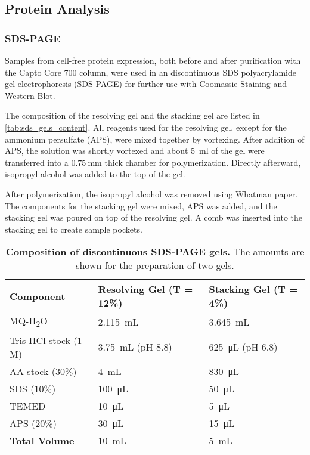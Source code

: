 \subsection{Protein Analysis}
\subsubsection{SDS-PAGE}
Samples from cell-free protein expression, both before and after purification with the Capto\textsuperscript{\texttrademark} Core 700 column, were used in an discontinuous SDS polyacrylamide gel electrophoresis (SDS-PAGE) for further use with Coomassie Staining and Western Blot. 

The composition of the resolving gel and the stacking gel are listed in \autoref{tab:sds_gels_content}. All reagents used for the resolving gel, except for the ammonium persulfate (APS), were mixed together by vortexing. After addition of APS, the solution was shortly vortexed and about \SI{5}{\milli\litre} of the gel were transferred into a $\SI{0.75}{\milli\metre}$ thick chamber for polymerization. Directly afterward, isopropyl alcohol was added to the top of the gel. 

After polymerization, the isopropyl alcohol was removed using Whatman paper. The components for the stacking gel were mixed, APS was added, and the stacking gel was poured on top of the resolving gel. A comb was inserted into the stacking gel to create sample pockets.

\begin{table}[h]
    \label{tab:sds_gels_content}
    \centering
    \caption{\textbf{Composition of discontinuous SDS-PAGE gels.} The amounts are shown for the preparation of two gels.}
    \begin{tabular}{@{}lll@{}}
    \toprule
    \textbf{Component} & \textbf{Resolving Gel (T = 12\%)} & \textbf{Stacking Gel (T = 4\%)} \\
    \midrule
    MQ-H\textsubscript{2}O       & \SI{2.115}{\milli\liter} & \SI{3.645}{\milli\liter} \\
    Tris-HCl stock (1 M)                    & \SI{3.75}{\milli\liter} (pH 8.8)  & \SI{625}{\micro\liter} (pH 6.8)  \\
    AA stock (30\%)                                       & \SI{4}{\milli\liter}     & \SI{830}{\micro\liter}   \\
    SDS (10\%)                                            & \SI{100}{\micro\liter}   & \SI{50}{\micro\liter}    \\
    TEMED                                                & \SI{10}{\micro\liter}    & \SI{5}{\micro\liter}     \\
    APS (20\%)                                            & \SI{30}{\micro\liter}    & \SI{15}{\micro\liter}    \\
    \textbf{Total Volume}                                 & \SI{10}{\milli\liter}    & \SI{5}{\milli\liter}     \\
    \bottomrule
    \end{tabular}
\end{table}


